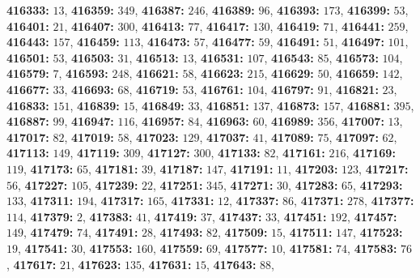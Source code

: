 \textsf{\bfseries 416333:} $13$, \textsf{\bfseries 416359:} $349$, \textsf{\bfseries 416387:} $246$, \textsf{\bfseries 416389:} $96$, \textsf{\bfseries 416393:} $173$, \textsf{\bfseries 416399:} $53$, \textsf{\bfseries 416401:} $21$, \textsf{\bfseries 416407:} $300$, \textsf{\bfseries 416413:} $77$, \textsf{\bfseries 416417:} $130$, \textsf{\bfseries 416419:} $71$, \textsf{\bfseries 416441:} $259$, \textsf{\bfseries 416443:} $157$, \textsf{\bfseries 416459:} $113$, \textsf{\bfseries 416473:} $57$, \textsf{\bfseries 416477:} $59$, \textsf{\bfseries 416491:} $51$, \textsf{\bfseries 416497:} $101$, \textsf{\bfseries 416501:} $53$, \textsf{\bfseries 416503:} $31$, \textsf{\bfseries 416513:} $13$, \textsf{\bfseries 416531:} $107$, \textsf{\bfseries 416543:} $85$, \textsf{\bfseries 416573:} $104$, \textsf{\bfseries 416579:} $7$, \textsf{\bfseries 416593:} $248$, \textsf{\bfseries 416621:} $58$, \textsf{\bfseries 416623:} $215$, \textsf{\bfseries 416629:} $50$, \textsf{\bfseries 416659:} $142$, \textsf{\bfseries 416677:} $33$, \textsf{\bfseries 416693:} $68$, \textsf{\bfseries 416719:} $53$, \textsf{\bfseries 416761:} $104$, \textsf{\bfseries 416797:} $91$, \textsf{\bfseries 416821:} $23$, \textsf{\bfseries 416833:} $151$, \textsf{\bfseries 416839:} $15$, \textsf{\bfseries 416849:} $33$, \textsf{\bfseries 416851:} $137$, \textsf{\bfseries 416873:} $157$, \textsf{\bfseries 416881:} $395$, \textsf{\bfseries 416887:} $99$, \textsf{\bfseries 416947:} $116$, \textsf{\bfseries 416957:} $84$, \textsf{\bfseries 416963:} $60$, \textsf{\bfseries 416989:} $356$, \textsf{\bfseries 417007:} $13$, \textsf{\bfseries 417017:} $82$, \textsf{\bfseries 417019:} $58$, \textsf{\bfseries 417023:} $129$, \textsf{\bfseries 417037:} $41$, \textsf{\bfseries 417089:} $75$, \textsf{\bfseries 417097:} $62$, \textsf{\bfseries 417113:} $149$, \textsf{\bfseries 417119:} $309$, \textsf{\bfseries 417127:} $300$, \textsf{\bfseries 417133:} $82$, \textsf{\bfseries 417161:} $216$, \textsf{\bfseries 417169:} $119$, \textsf{\bfseries 417173:} $65$, \textsf{\bfseries 417181:} $39$, \textsf{\bfseries 417187:} $147$, \textsf{\bfseries 417191:} $11$, \textsf{\bfseries 417203:} $123$, \textsf{\bfseries 417217:} $56$, \textsf{\bfseries 417227:} $105$, \textsf{\bfseries 417239:} $22$, \textsf{\bfseries 417251:} $345$, \textsf{\bfseries 417271:} $30$, \textsf{\bfseries 417283:} $65$, \textsf{\bfseries 417293:} $133$, \textsf{\bfseries 417311:} $194$, \textsf{\bfseries 417317:} $165$, \textsf{\bfseries 417331:} $12$, \textsf{\bfseries 417337:} $86$, \textsf{\bfseries 417371:} $278$, \textsf{\bfseries 417377:} $114$, \textsf{\bfseries 417379:} $2$, \textsf{\bfseries 417383:} $41$, \textsf{\bfseries 417419:} $37$, \textsf{\bfseries 417437:} $33$, \textsf{\bfseries 417451:} $192$, \textsf{\bfseries 417457:} $149$, \textsf{\bfseries 417479:} $74$, \textsf{\bfseries 417491:} $28$, \textsf{\bfseries 417493:} $82$, \textsf{\bfseries 417509:} $15$, \textsf{\bfseries 417511:} $147$, \textsf{\bfseries 417523:} $19$, \textsf{\bfseries 417541:} $30$, \textsf{\bfseries 417553:} $160$, \textsf{\bfseries 417559:} $69$, \textsf{\bfseries 417577:} $10$, \textsf{\bfseries 417581:} $74$, \textsf{\bfseries 417583:} $76$, \textsf{\bfseries 417617:} $21$, \textsf{\bfseries 417623:} $135$, \textsf{\bfseries 417631:} $15$, \textsf{\bfseries 417643:} $88$, 
